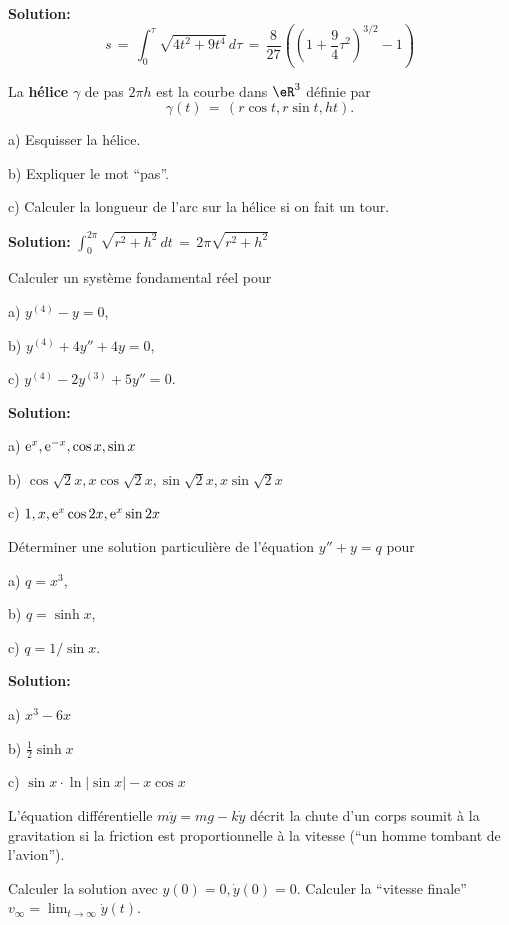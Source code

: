 \medskip
{\bf Solution:}
$$
s \,=\, \int_0^\tau \sqrt{4 t^2+9t^4} \,d\tau \,=\, \frac{8}{27} \left( \left(1+ \frac 94 \tau^2\right)^{3/2}-1 \right)
$$



\exerNico  
La {\bf hélice} $\gamma$ de pas $2 \pi h$ est la courbe dans $\eR^3$ définie par
$$
\gamma(t) \,=\, \left( r \cos t , r \sin t , h t \right)  .
$$


\medskip
a)
Esquisser la hélice.

\medskip
b)
Expliquer le mot ``pas''.


\medskip
c)
Calculer la longueur de l'arc sur la hélice si on fait un tour.

\medskip
{\bf Solution:} 
$\int_0^{2\pi} \sqrt{r^2+h^2} \,dt \,=\, 2 \pi \sqrt{r^2+h^2}$


\bigskip
\exerNico 
Calculer un système fondamental réel pour

\medskip
a) $y^{(4)}-y = 0$,

\medskip
b) $y^{(4)} +4y'' +4y = 0$,

\medskip
c) $y^{(4)} -2y^{(3)} +5y'' = 0$.


\bigskip
{\bf Solution:}

\medskip
a) ${\rm e}^x, {\rm e}^{-x}, \cos x, \sin x$

\medskip
b) $\cos \sqrt{2} x, x \cos \sqrt{2}x, \sin \sqrt{2}x, x \sin \sqrt{2}x$

\medskip
c)
$1, x, {\rm e}^x \cos 2x, {\rm e}^x \sin 2x$



\bigskip
\exerNico 
Déterminer une solution particulière de l'équation
$y''+y=q$ pour

\medskip
a) $q = x^3$,

\medskip
b) $q = \sinh x$,

\medskip
c) $q = 1/\sin x$.
 

\bigskip
{\bf Solution:}

\medskip
a) $x^3 - 6 x$

\medskip
b) $\frac 12 \sinh x$

\medskip
c) $\sin x \cdot \ln |\sin x| - x \cos x$


\bigskip
\exerNico  
L'équation différentielle $m \ddot y = mg - k\dot y$ 
décrit la chute d'un corps soumit
à la gravitation si la friction est proportionnelle à la vitesse (``un homme tombant de l'avion'').

\medskip
Calculer la solution avec $y(0) =0, \dot y(0) = 0$.
Calculer la ``vitesse finale'' $v_\infty = \displaystyle \lim_{t \to \infty} \dot y (t)$.



